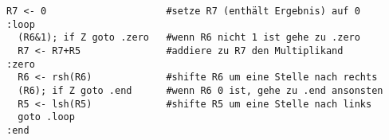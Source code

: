 \documentclass[a4paper, 12pt, margins=2cm]{homework}
\begin{document}
\begin{solution}
\begin{enumerate}[label=(\alph*)]
      \begin{lstlisting}
R7 <- 0                     #setze R7 (enthält Ergebnis) auf 0
:loop
  (R6&1); if Z goto .zero   #wenn R6 nicht 1 ist gehe zu .zero
  R7 <- R7+R5               #addiere zu R7 den Multiplikand
:zero
  R6 <- rsh(R6)             #shifte R6 um eine Stelle nach rechts
  (R6); if Z goto .end      #wenn R6 0 ist, gehe zu .end ansonsten
  R5 <- lsh(R5)             #shifte R5 um eine Stelle nach links
  goto .loop
:end\end{lstlisting}
    \end{enumerate}

  \end{solution}

\newpage

  \begin{problem}
  \end{problem}
\end{document}
